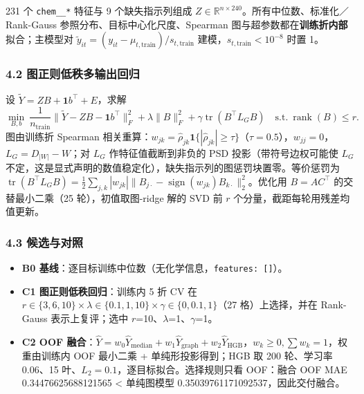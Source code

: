 \documentclass[
  11pt,
]{article}
\providecommand{\tightlist}{%
  \setlength{\itemsep}{0pt}\setlength{\parskip}{0pt}}
\begin{document}
231 个 \texttt{chem\_\_*} 特征与 9 个缺失指示列组成
\(Z\in\mathbb R^{n\times 240}\)。所有中位数、标准化／Rank-Gauss
参照分布、目标中心化尺度、Spearman
图与超参数都在\textbf{训练折内部}拟合；主模型对
\(\widetilde y_{it}=(y_{it}-\mu_{t,\mathrm{train}})/s_{t,\mathrm{train}}\)
建模，\(s_{t,\mathrm{train}}<10^{-8}\) 时置 1。

\subsubsection{4.2
图正则低秩多输出回归}\label{ux56feux6b63ux5219ux4f4eux79e9ux591aux8f93ux51faux56deux5f52}

设 \(\widetilde Y=ZB+\mathbf 1b^\top+E\)，求解 \[
\min_{B,b}\ \frac1{n_{\mathrm{train}}}\big\|\widetilde Y-ZB-\mathbf 1b^\top\big\|_F^2+\lambda\|B\|_F^2+\gamma\operatorname{tr}(B^\top L_G B)\quad\text{s.t.}\ \operatorname{rank}(B)\le r .
\] 图由训练折 Spearman
相关重算：\(w_{jk}=\hat\rho_{jk}\mathbf 1\{|\hat\rho_{jk}|\ge\tau\}\)（\(\tau=0.5\)），\(w_{jj}=0\)，\(L_G=D_{|W|}-W\)；对
\(L_G\) 作特征值截断到非负的 PSD 投影（带符号边权可能使 \(L_G\)
不定，这是显式声明的数值稳定化），缺失指示列的图惩罚块置零。等价惩罚为
\(\operatorname{tr}(B^\top L_GB)=\tfrac12\sum_{j,k}|w_{jk}|\|B_{j\cdot}-\operatorname{sign}(w_{jk})B_{k\cdot}\|_2^2\)。优化用
\(B=AC^\top\) 的交替最小二乘（25 轮），初值取图-ridge 解的 SVD 前 \(r\)
个分量，截距每轮用残差均值更新。

\subsubsection{4.3 候选与对照}\label{ux5019ux9009ux4e0eux5bf9ux7167}

\begin{itemize}
\tightlist
\item
  \textbf{B0
  基线}：逐目标训练中位数（无化学信息，\texttt{features:\ {[}{]}}）。
\item
  \textbf{C1 图正则低秩回归}：训练内 5 折 CV 在
  \(r\in\{3,6,10\}\times\lambda\in\{0.1,1,10\}\times\gamma\in\{0,0.1,1\}\)（27
  格）上选择，并在 Rank-Gauss 表示上复评；选中
  \(r\)=10、\(\lambda\)=1、\(\gamma\)=1。
\item
  \textbf{C2 OOF
  融合}：\(\widehat Y=w_0\widehat Y_{\mathrm{median}}+w_1\widehat Y_{\mathrm{graph}}+w_2\widehat Y_{\mathrm{HGB}}\)，\(w_k\ge0,\sum w_k=1\)，权重由训练内
  OOF 最小二乘 + 单纯形投影得到；HGB 取 200 轮、学习率 0.06、15
  叶、\(L_2=0.1\)，逐目标拟合。选择规则只看 OOF：融合 OOF MAE
  0.34476625688121565 \textless{} 单纯图模型
  0.35039761171092537，因此交付融合。
\end{itemize}
\end{document}
